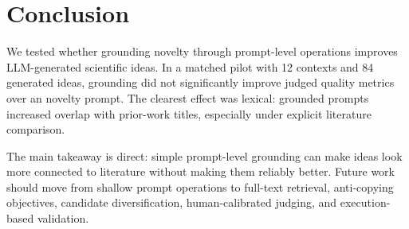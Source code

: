 \section{Conclusion}
\label{sec:conclusion}

We tested whether grounding novelty through prompt-level operations improves LLM-generated scientific ideas. In a matched pilot with 12 \aibidea contexts and 84 generated ideas, grounding did not significantly improve judged quality metrics over an \ungrounded novelty prompt. The clearest effect was lexical: grounded prompts increased overlap with prior-work titles, especially under explicit literature comparison.

The main takeaway is direct: simple prompt-level grounding can make ideas look more connected to literature without making them reliably better. Future work should move from shallow prompt operations to full-text retrieval, anti-copying objectives, candidate diversification, human-calibrated judging, and execution-based validation.
